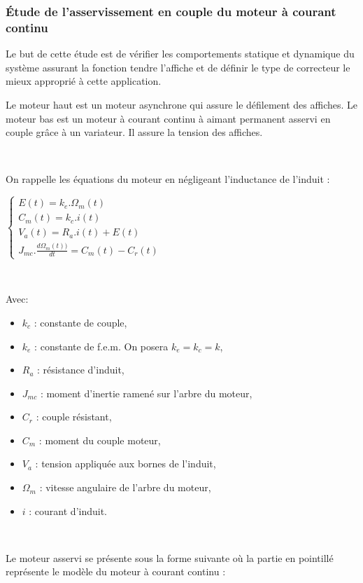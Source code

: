 \subsubsection{Étude de l'asservissement en couple du moteur à courant continu}

Le but de cette étude est de vérifier les comportements statique et dynamique du système assurant la fonction \og tendre l'affiche \fg et de définir le type de correcteur le mieux approprié à cette application.

Le moteur haut est un moteur asynchrone qui assure le défilement des affiches. Le moteur bas est un moteur à courant continu à aimant permanent asservi en couple grâce à un variateur. Il assure la tension des affiches.

~\

On rappelle les équations du moteur en négligeant l'inductance de l'induit :

$\left\{\begin{array}{l}
E(t)=k_e.\Omega_m (t) \\
C_m(t)=k_c.i(t) \\
V_a(t)=R_a.i(t)+E(t)\\
J_{mc}.\frac{d\Omega_m(t))}{dt}=C_m(t)-C_r(t)
\end{array}\right.$

~\

Avec:
\begin{itemize}
 \item $k_c$ : constante de couple,
 \item $k_e$ : constante de f.e.m. On posera $k_e=k_c=k$,
 \item $R_a$ : résistance d'induit,
 \item $J_{mc}$ : moment d'inertie ramené sur l'arbre du moteur,
 \item $C_r$ : couple résistant,
 \item $C_m$ : moment du couple moteur,
 \item $V_a$ : tension appliquée aux bornes de l'induit, 
 \item $\Omega_m$ : vitesse angulaire de l'arbre du moteur,
 \item $i$ : courant d'induit.
\end{itemize}

\newpage


~\

Le moteur asservi se présente sous la forme suivante où la partie en pointillé représente le modèle du moteur à courant continu :

